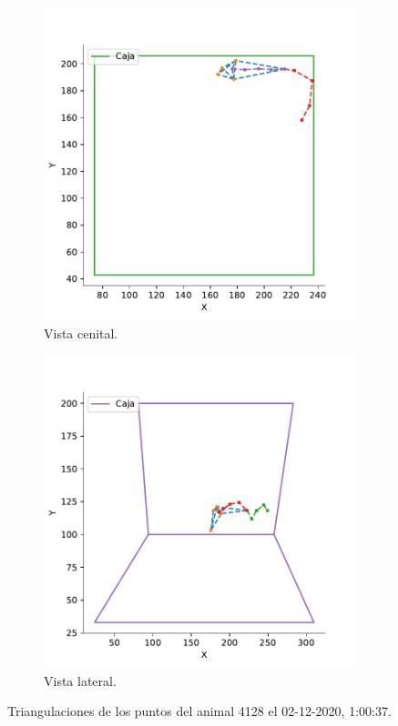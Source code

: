 \begin{figure}[H]
  \centering
  \begin{subfigure}{0.45\textwidth}
    \centering
    \includegraphics[width=\textwidth]{figures/triangulation-top-4128-2020-12-02.pdf}
    \caption{Vista cenital.}
  \end{subfigure}
  \begin{subfigure}{0.45\textwidth}
    \centering
    \includegraphics[width=\textwidth]{figures/triangulation-lateral-4128-2020-12-02.pdf}
    \caption{Vista lateral.}
  \end{subfigure}
  \caption{Triangulaciones de los puntos del animal 4128 el 02-12-2020, 1:00:37.}
  \label{fig:triangulations}
\end{figure}

